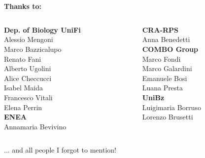 \documentclass[10pt]{beamer}
\begin{document}

\section*{}
\begin{frame}
	\vspace{2mm}
	{\huge\textbf{Thanks to:}}
	\vspace{3mm}
	\begin{columns}[T]
		\begin{column}{0.5\textwidth}
			{\large\textbf{Dep. of Biology UniFi}}\\
			Alessio Mengoni\\
			Marco Bazzicalupo\\
			Renato Fani\\
			Alberto Ugolini\\
			Alice Checcucci\\
			Isabel Maida\\			
			Francesco Vitali	\\
			Elena Perrin\\
			\vspace{2mm}
			{\large\textbf{ENEA}}\\
			Annamaria Bevivino\\
		\end{column}
		\begin{column}{0.5\textwidth}
			{\large\textbf{CRA-RPS}}\\
			Anna Benedetti\\
			\vspace{2mm}
			{\large\textbf{COMBO Group}}\\
			Marco Fondi\\
			Marco Galardini\\
			Emanuele Bosi\\
			Luana Presta\\				
			\vspace{2mm}
			{\large\textbf{UniBz}}\\
			Luigimaria Borruso\\
			Lorenzo Brusetti
		\end{column}
	\end{columns}
	\vspace{8mm}
	\let\thefootnote\relax\large{... and all people I forgot to mention!}
\end{frame}
\end{document}
